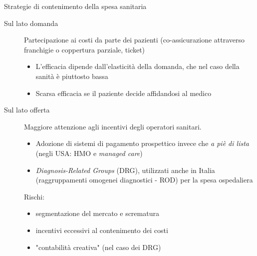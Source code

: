 \documentclass[aspectratio=64,11pt]{beamer}
\begin{document}
\begin{frame}{Strategie di contenimento della spesa sanitaria}
\begin{description}
\item[{Sul lato domanda}] Partecipazione ai costi da parte dei pazienti
(co-assicurazione attraverso franchigie o coppertura parziale, ticket)
\begin{itemize}
\item L'efficacia dipende dall'elasticità della domanda, che nel caso della
sanità è piuttosto bassa
\item Scarsa efficacia se il paziente decide affidandosi al medico
\end{itemize}
\item[{Sul lato offerta}] Maggiore attenzione agli incentivi degli operatori
sanitari.
\begin{itemize}
\item Adozione di sistemi di pagamento prospettico invece che \emph{a piè di lista}
(negli USA: HMO e \emph{managed care})
\item \emph{Diagnosis-Related Groups} (DRG), utilizzati anche in Italia
(raggruppamenti omogenei diagnostici - ROD) per la spesa ospedaliera
\end{itemize}
Rischi: 
\begin{itemize}
\item segmentazione del mercato e scrematura
\item incentivi eccessivi al contenimento dei costi
\item "contabilità creativa" (nel caso dei DRG)
\end{itemize}
\end{description}
\end{frame}
\end{document}
